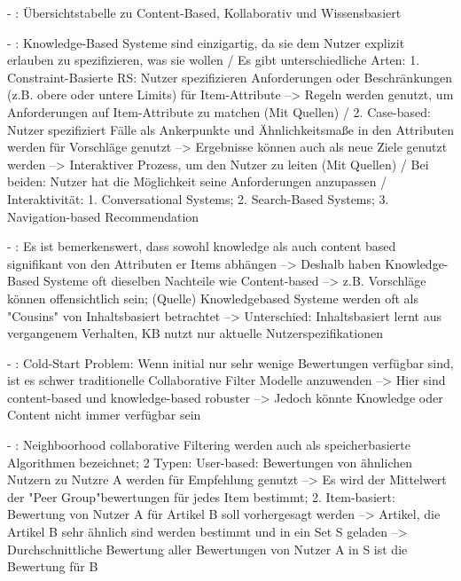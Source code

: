 - \cite[S. 16]{recommenderSystems:2016}: Übersichtstabelle zu Content-Based, Kollaborativ und Wissensbasiert 

- \cite[S. 16f.]{recommenderSystems:2016}: Knowledge-Based Systeme sind einzigartig, da sie dem Nutzer explizit erlauben zu spezifizieren, was sie wollen / Es gibt unterschiedliche Arten: 1. Constraint-Basierte RS: Nutzer spezifizieren Anforderungen oder Beschränkungen (z.B. obere oder untere Limits) für Item-Attribute --> Regeln werden genutzt, um Anforderungen auf Item-Attribute zu matchen (Mit Quellen) / 2. Case-based: Nutzer spezifiziert Fälle als Ankerpunkte und Ähnlichkeitsmaße in den Attributen werden für Vorschläge genutzt --> Ergebnisse können auch als neue Ziele genutzt werden --> Interaktiver Prozess, um den Nutzer zu leiten (Mit Quellen) / Bei beiden: Nutzer hat die Möglichkeit seine Anforderungen anzupassen / Interaktivität: 1. Conversational Systems; 2. Search-Based Systems; 3. Navigation-based Recommendation

- \cite[S. 18]{recommenderSystems:2016}: Es ist bemerkenswert, dass sowohl knowledge als auch content based signifikant von den Attributen er Items abhängen --> Deshalb haben Knowledge-Based Systeme oft dieselben Nachteile wie Content-based --> z.B. Vorschläge können offensichtlich sein; (Quelle) Knowledgebased Systeme werden oft als "Cousins" von Inhaltsbasiert betrachtet --> Unterschied: Inhaltsbasiert lernt aus vergangenem Verhalten, KB nutzt nur aktuelle Nutzerspezifikationen 

- \cite[S. 24]{recommenderSystems:2016}: Cold-Start Problem: Wenn initial nur sehr wenige Bewertungen verfügbar sind, ist es schwer traditionelle Collaborative Filter Modelle anzuwenden --> Hier sind content-based und knowledge-based robuster --> Jedoch könnte Knowledge oder Content nicht immer verfügbar sein

- \cite[S. 29]{recommenderSystems:2016}: Neighboorhood collaborative Filtering werden auch als speicherbasierte Algorithmen bezeichnet; 2 Typen: User-based: Bewertungen von ähnlichen Nutzern zu Nutzre A werden für Empfehlung genutzt --> Es wird der Mittelwert der "Peer Group"bewertungen für jedes Item bestimmt; 2. Item-basiert: Bewertung von Nutzer A für Artikel B soll vorhergesagt werden --> Artikel, die Artikel B sehr ähnlich sind werden bestimmt und in ein Set S geladen --> Durchschnittliche Bewertung aller Bewertungen von Nutzer A in S ist die Bewertung für B

